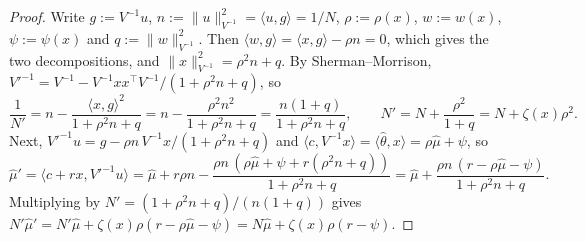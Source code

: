 \documentclass[anon]{alt2027} %
\begin{document}
\begin{proof}
Write $g:=V^{-1}u$, $n:=\|u\|^2_{V^{-1}}=\langle u,g\rangle=1/N$,
$\rho:=\rho(x)$, $w:=w(x)$, $\psi:=\psi(x)$ and $q:=\|w\|^2_{V^{-1}}$. Then
$\langle w,g\rangle=\langle x,g\rangle-\rho n=0$, which gives the two
decompositions, and $\|x\|^2_{V^{-1}}=\rho^2n+q$. By Sherman--Morrison,
$V'^{-1}=V^{-1}-V^{-1}xx^\top V^{-1}/(1+\rho^2n+q)$, so
\[
\frac1{N'}=n-\frac{\langle x,g\rangle^2}{1+\rho^2n+q}
=n-\frac{\rho^2n^2}{1+\rho^2n+q}=\frac{n(1+q)}{1+\rho^2n+q},
\qquad
N'=N+\frac{\rho^2}{1+q}=N+\zeta(x)\rho^2 .
\]
Next, $V'^{-1}u=g-\rho n\,V^{-1}x/(1+\rho^2n+q)$ and
$\langle c,V^{-1}x\rangle=\langle\widehat\theta,x\rangle=\rho\widehat\mu+\psi$, so
\[
\widehat\mu'=\langle c+rx,V'^{-1}u\rangle
=\widehat\mu+r\rho n-\frac{\rho n\,(\rho\widehat\mu+\psi+r(\rho^2n+q))}{1+\rho^2n+q}
=\widehat\mu+\frac{\rho n\,(r-\rho\widehat\mu-\psi)}{1+\rho^2n+q}.
\]
Multiplying by $N'=(1+\rho^2n+q)/(n(1+q))$ gives
$N'\widehat\mu'=N'\widehat\mu+\zeta(x)\rho(r-\rho\widehat\mu-\psi)
=N\widehat\mu+\zeta(x)\rho(r-\psi)$.
\end{proof}
\end{document}
